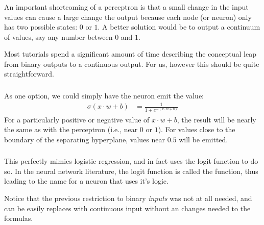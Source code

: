 \documentclass[xetex,mathserif,serif,aspectratio=169]{beamer}
\begin{document}
\begin{frame}[fragile] \frametitle{} \oldB \small


An important shortcoming of a perceptron is that a small change in
the input values can cause a large change the output because each
node (or neuron) only has two possible states: $0$ or $1$. A better
solution would be to output a continuum of values, say any number
between $0$ and $1$.

Most tutorials spend a significant amount of time describing the
conceptual leap from binary outputs to a continuous output. For
us, however this should be quite straightforward.

\end{frame}

\begin{frame}[fragile] \frametitle{} \oldB \small


As one option, we could simply have the neuron emit the
value:
\begin{align*}
\sigma(x \cdot w + b) &= \frac{1}{1 + e^{-(x \cdot w + b)}}
\end{align*}
For a particularly positive or negative value of $x \cdot w + b$,
the result will be nearly the same as with the perceptron (i.e.,
near $0$ or $1$). For values close to the boundary of the separating
hyperplane, values near $0.5$ will be emitted.

\end{frame}

\begin{frame}[fragile] \frametitle{} \oldB \small


This perfectly mimics logistic regression, and in fact uses the
logit function to do so. In the neural network literature, the
logit function is called the  function, thus leading
to the name  for a neuron that uses it's logic.

Notice that the previous restriction to binary \textit{inputs} was
not at all needed, and can be easily replaces with continuous input
without an changes needed to the formulas.

\end{frame}
\end{document}
